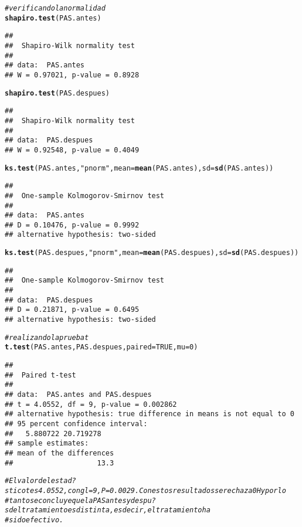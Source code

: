 \documentclass[10pt,a4paper]{article}\usepackage[]{graphicx}\usepackage[]{color}
\makeatletter
\newcommand{\hlnum}[1]{\textcolor[rgb]{0.686,0.059,0.569}{#1}}%
\newcommand{\hlstr}[1]{\textcolor[rgb]{0.192,0.494,0.8}{#1}}%
\newcommand{\hlcom}[1]{\textcolor[rgb]{0.678,0.584,0.686}{\textit{#1}}}%
\newcommand{\hlstd}[1]{\textcolor[rgb]{0.345,0.345,0.345}{#1}}%
\newcommand{\hlkwc}[1]{\textcolor[rgb]{0.333,0.667,0.333}{#1}}%
\newcommand{\hlkwd}[1]{\textcolor[rgb]{0.737,0.353,0.396}{\textbf{#1}}}%
\newenvironment{kframe}{%
 \def\at@end@of@kframe{}%
 \ifinner\ifhmode%
  \def\at@end@of@kframe{\end{minipage}}%
  \begin{minipage}{\columnwidth}%
 \fi\fi%
 \def\FrameCommand##1{\hskip\@totalleftmargin \hskip-\fboxsep
 \colorbox{shadecolor}{##1}\hskip-\fboxsep
     \hskip-\linewidth \hskip-\@totalleftmargin \hskip\columnwidth}%
 \MakeFramed {\advance\hsize-\width
   \@totalleftmargin\z@ \linewidth\hsize
   \@setminipage}}%
 {\par\unskip\endMakeFramed%
 \at@end@of@kframe}
\newenvironment{knitrout}{}{} %
\makeatother
\begin{document}
\begin{knitrout}
\begin{kframe}
\begin{alltt}
\hlcom{#verificando la normalidad }
\hlkwd{shapiro.test}\hlstd{(PAS.antes)}
\end{alltt}
\begin{verbatim}
## 
## 	Shapiro-Wilk normality test
## 
## data:  PAS.antes
## W = 0.97021, p-value = 0.8928
\end{verbatim}
\begin{alltt}
\hlkwd{shapiro.test}\hlstd{(PAS.despues)}
\end{alltt}
\begin{verbatim}
## 
## 	Shapiro-Wilk normality test
## 
## data:  PAS.despues
## W = 0.92548, p-value = 0.4049
\end{verbatim}
\begin{alltt}
\hlkwd{ks.test}\hlstd{(PAS.antes,}\hlstr{"pnorm"}\hlstd{,}\hlkwc{mean}\hlstd{=}\hlkwd{mean}\hlstd{(PAS.antes),}\hlkwc{sd}\hlstd{=}\hlkwd{sd}\hlstd{(PAS.antes))}
\end{alltt}
\begin{verbatim}
## 
## 	One-sample Kolmogorov-Smirnov test
## 
## data:  PAS.antes
## D = 0.10476, p-value = 0.9992
## alternative hypothesis: two-sided
\end{verbatim}
\begin{alltt}
\hlkwd{ks.test}\hlstd{(PAS.despues,}\hlstr{"pnorm"}\hlstd{,}\hlkwc{mean}\hlstd{=}\hlkwd{mean}\hlstd{(PAS.despues),}\hlkwc{sd}\hlstd{=}\hlkwd{sd}\hlstd{(PAS.despues))}
\end{alltt}
\begin{verbatim}
## 
## 	One-sample Kolmogorov-Smirnov test
## 
## data:  PAS.despues
## D = 0.21871, p-value = 0.6495
## alternative hypothesis: two-sided
\end{verbatim}
\begin{alltt}
\hlcom{#realizando la prueba t}
\hlkwd{t.test}\hlstd{(PAS.antes, PAS.despues,} \hlkwc{paired}\hlstd{=}\hlnum{TRUE}\hlstd{,} \hlkwc{mu}\hlstd{=}\hlnum{0}\hlstd{)}
\end{alltt}
\begin{verbatim}
## 
## 	Paired t-test
## 
## data:  PAS.antes and PAS.despues
## t = 4.0552, df = 9, p-value = 0.002862
## alternative hypothesis: true difference in means is not equal to 0
## 95 percent confidence interval:
##   5.880722 20.719278
## sample estimates:
## mean of the differences 
##                    13.3
\end{verbatim}
\begin{alltt}
\hlcom{#El valor del estad?stico t es 4.0552, con gl = 9, P = 0.0029. Con estos resultados se rechaza  0 Hy por lo }
\hlcom{#tanto se concluye que la PAS antes y despu?s del tratamiento es distinta, es decir, el tratamiento ha }
\hlcom{#sido efectivo.}



\end{alltt}
\end{kframe}
\end{knitrout}
\end{document}
